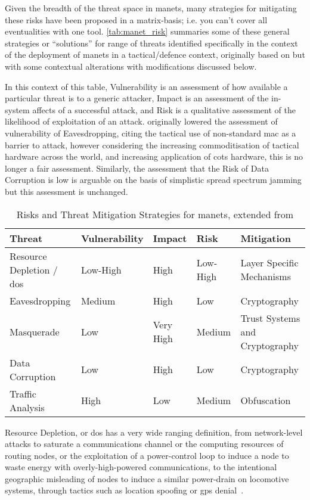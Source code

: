 Given the breadth of the threat space in \glspl{manet}, many strategies for mitigating these risks have been proposed in a matrix-basis; i.e. you can't cover all eventualities with one tool.
\autoref{tab:manet_risk} summaries some of these general strategies or ``solutions'' for range of threats identified specifically in the context of the deployment of \glspl{manet} in a tactical/defence context, originally based on \citet{Kidston2010} but with some contextual alterations with modifications discussed below.

In this context of this table, Vulnerability is an assessment of how available a particular threat is to a generic attacker, Impact is an assessment of the in-system affects of a successful attack, and Risk is a qualitative assessment of the likelihood of exploitation of an attack.
\citet{Kidston2010} originally lowered the assessment of vulnerability of Eavesdropping, citing the tactical use of non-standard \gls{mac} as a barrier to attack, however considering the increasing commoditisation of tactical hardware across the world, and increasing application of \gls{cots} hardware, this is no longer a fair assessment.
Similarly, the assessment that the Risk of Data Corruption is low is arguable on the basis of simplistic spread spectrum jamming but this assessment is unchanged.

\begin{table}
	\caption{Risks and Threat Mitigation Strategies for \glspl{manet}, extended from \cite{Kidston2010}}
	\label{tab:manet_risk}
	\begin{tabularx}{\textwidth}{X X X X X}\toprule
		Threat & Vulnerability & Impact & Risk & Mitigation	\\\midrule
		Resource Depletion / \gls{dos} & Low-High & High & Low-High & Layer Specific Mechanisms\cite{Wu2007,Nwaocha2015}\\
		Eavesdropping & Medium & High & Low & Cryptography \cite{Chen2010}\\
		Masquerade & Low & Very High & Medium & Trust Systems\cite{Wang2009a} and Cryptography\\
		Data Corruption & Low & High & Low & Cryptography\\
		Traffic Analysis & High & Low & Medium & Obfuscation\cite{Huang2010}\\
	\end{tabularx}
\end{table}

Resource Depletion, or \gls{dos} has a very wide ranging definition, from network-level attacks to saturate a communications channel or the computing resources of routing nodes, or the exploitation of a power-control loop to induce a node to waste energy with overly-high-powered communications, to the intentional geographic misleading of nodes to induce a similar power-drain on locomotive systems, through tactics such as location spoofing or \gls{gps} denial~\cite{Zuba2015}.

